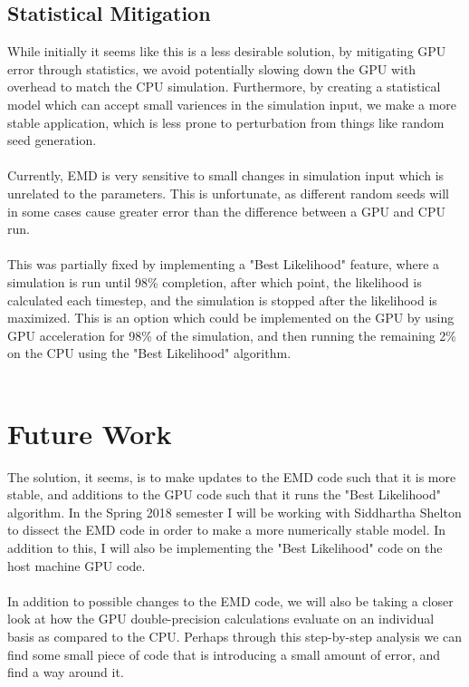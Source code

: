 \documentclass[fleqn,10pt]{SelfArx} %
\begin{document}
        \subsection{Statistical Mitigation}
            While initially it seems like this is a less desirable solution, by mitigating GPU error through statistics, we avoid potentially slowing down the GPU with overhead to match the CPU simulation. Furthermore, by creating a statistical model which can accept small variences in the simulation input, we make a more stable application, which is less prone to perturbation from things like random seed generation.\\~\\
            Currently, EMD is very sensitive to small changes in simulation input which is unrelated to the parameters. This is unfortunate, as different random seeds will in some cases cause greater error than the difference between a GPU and CPU run.\\~\\
            This was partially fixed by implementing a "Best Likelihood" feature, where a simulation is run until 98\% completion, after which point, the likelihood is calculated each timestep, and the simulation is stopped after the likelihood is maximized. This is an option which could be implemented on the GPU by using GPU acceleration for 98\% of the simulation, and then running the remaining 2\% on the CPU using the "Best Likelihood" algorithm.\\~\\

\section{Future Work}
The solution, it seems, is to make updates to the EMD code such that it is more stable, and additions to the GPU code such that it runs the "Best Likelihood" algorithm. In the Spring 2018 semester I will be working with Siddhartha Shelton to dissect the EMD code in order to make a more numerically stable model. In addition to this, I will also be implementing the "Best Likelihood" code on the host machine GPU code.\\~\\
In addition to possible changes to the EMD code, we will also be taking a closer look at how the GPU double-precision calculations evaluate on an individual basis as compared to the CPU. Perhaps through this step-by-step analysis we can find some small piece of code that is introducing a small amount of error, and find a way around it.
\end{document}
